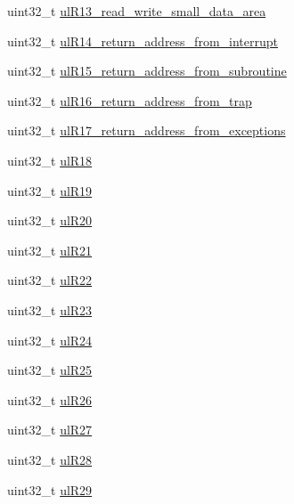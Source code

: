 \begin{DoxyCompactItemize}
uint32\-\_\-t \hyperlink{structPORT__REGISTER__DUMP_ab70e859be6e6680c50810f54e05e7e18}{ul\-R13\-\_\-read\-\_\-write\-\_\-small\-\_\-data\-\_\-area}
\item 
uint32\-\_\-t \hyperlink{structPORT__REGISTER__DUMP_a4559c40bb239c1a1f5aed5471a2e720c}{ul\-R14\-\_\-return\-\_\-address\-\_\-from\-\_\-interrupt}
\item 
uint32\-\_\-t \hyperlink{structPORT__REGISTER__DUMP_af4c6210d21e50b699fd6a16945361f31}{ul\-R15\-\_\-return\-\_\-address\-\_\-from\-\_\-subroutine}
\item 
uint32\-\_\-t \hyperlink{structPORT__REGISTER__DUMP_a2ea113e44b87342a7bf02cfb465deb80}{ul\-R16\-\_\-return\-\_\-address\-\_\-from\-\_\-trap}
\item 
uint32\-\_\-t \hyperlink{structPORT__REGISTER__DUMP_a2d72f1aedaf7228427d71fda19382b09}{ul\-R17\-\_\-return\-\_\-address\-\_\-from\-\_\-exceptions}
\item 
uint32\-\_\-t \hyperlink{structPORT__REGISTER__DUMP_abfc3225f4a85989240adb7de970b235d}{ul\-R18}
\item 
uint32\-\_\-t \hyperlink{structPORT__REGISTER__DUMP_a3853fbe7bdc0dd5a32d9a5c0bc2658c6}{ul\-R19}
\item 
uint32\-\_\-t \hyperlink{structPORT__REGISTER__DUMP_a61cbd94b8dc6fccf3f83e58fc624856b}{ul\-R20}
\item 
uint32\-\_\-t \hyperlink{structPORT__REGISTER__DUMP_a09fd3c8c3c5ff635a9bc51e9a600516b}{ul\-R21}
\item 
uint32\-\_\-t \hyperlink{structPORT__REGISTER__DUMP_a08218b684d103e40daa2adb7cce39fa1}{ul\-R22}
\item 
uint32\-\_\-t \hyperlink{structPORT__REGISTER__DUMP_ac65b589eca595475725ef8fdd3ea145f}{ul\-R23}
\item 
uint32\-\_\-t \hyperlink{structPORT__REGISTER__DUMP_acdf0d3f8c86d010d66647d468f7bc82b}{ul\-R24}
\item 
uint32\-\_\-t \hyperlink{structPORT__REGISTER__DUMP_ab6b74f567e96d3632ecbdfadb49f471e}{ul\-R25}
\item 
uint32\-\_\-t \hyperlink{structPORT__REGISTER__DUMP_abf56778b08c517588eb57f8fd13aaf84}{ul\-R26}
\item 
uint32\-\_\-t \hyperlink{structPORT__REGISTER__DUMP_ab8de33382f3eaf05ad7ee02e5b536dc5}{ul\-R27}
\item 
uint32\-\_\-t \hyperlink{structPORT__REGISTER__DUMP_aaca582d1fea6ce05c3259892f907b966}{ul\-R28}
\item 
uint32\-\_\-t \hyperlink{structPORT__REGISTER__DUMP_ae1cbc3d4bbbc39f103917e20e64bbd80}{ul\-R29}

\end{DoxyCompactItemize}
